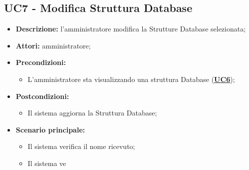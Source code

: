 \subsection{UC7 - Modifica Struttura Database}
\label{sec:UC7}
\begin{itemize}
	\item \textbf{Descrizione:} l’amministratore modifica la Strutture Database selezionata;
	\item \textbf{Attori:} amministratore;
	\item \textbf{Precondizioni:} 
	\begin{itemize}
		\item L’amministratore sta visualizzando una struttura Database (\hyperref[sec:UC6]{\textbf{UC6}});
	\end{itemize}
	\item \textbf{Postcondizioni:} 
	\begin{itemize}
		\item Il sistema aggiorna la Struttura Database;
	\end{itemize}
	\item \textbf{Scenario principale:} 
	\begin{itemize}
		\item Il sistema verifica il nome ricevuto;
		\item Il sistema ve
	\end{itemize}
\end{itemize}

